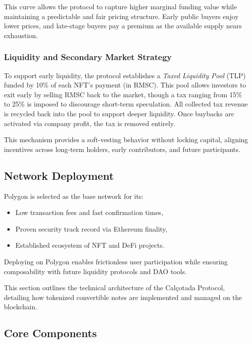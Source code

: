 \documentclass[conference]{IEEEtran}
\begin{document}
This curve allows the protocol to capture higher marginal funding value while maintaining a predictable and fair pricing structure. Early public buyers enjoy lower prices, and late-stage buyers pay a premium as the available supply nears exhaustion.

\subsubsection{Liquidity and Secondary Market Strategy}

To support early liquidity, the protocol establishes a \textit{Taxed Liquidity Pool} (TLP) funded by 10\% of each NFT’s payment (in RMSC). This pool allows investors to exit early by selling RMSC back to the market, though a tax ranging from 15\% to 25\% is imposed to discourage short-term speculation. All collected tax revenue is recycled back into the pool to support deeper liquidity. Once buybacks are activated via company profit, the tax is removed entirely.

This mechanism provides a soft-vesting behavior without locking capital, aligning incentives across long-term holders, early contributors, and future participants.


\subsection{Network Deployment}

Polygon is selected as the base network for its:
\begin{itemize}
    \item Low transaction fees and fast confirmation times,
    \item Proven security track record via Ethereum finality,
    \item Established ecosystem of NFT and DeFi projects.
\end{itemize}

Deploying on Polygon enables frictionless user participation while ensuring composability with future liquidity protocols and DAO tools.



This section outlines the technical architecture of the Calçotada Protocol, detailing how tokenized convertible notes are implemented and managed on the blockchain.

\subsection{Core Components}
\end{document}
